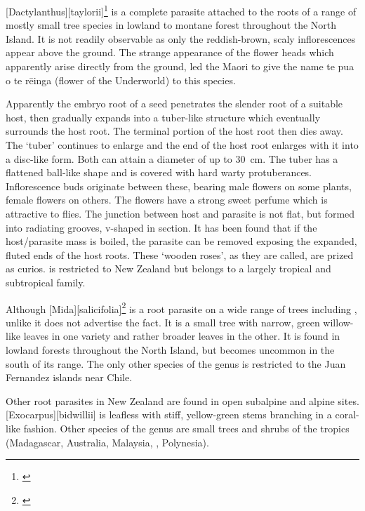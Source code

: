 [Dactylanthus][taylorii]\footnote{\cite{moore1940structure}} is a complete parasite attached to the roots of a range of mostly small tree species in lowland to montane forest throughout the North Island.
It is not readily observable as only the reddish-brown, scaly inflorescences appear above the ground.
The strange appearance of the flower heads which apparently arise directly from the ground, led the Maori to give the name te pua o te rēinga (flower of the Underworld) to this species.

Apparently the embryo root of a  seed penetrates the slender root of a suitable host, then gradually expands into a tuber-like structure which eventually surrounds the host root.
The terminal portion of the host root then dies away.
The `tuber' continues to enlarge and the end of the host root enlarges with it into a disc-like form.
Both can attain a diameter of up to \SI{30}{\centi\metre}.
The tuber has a flattened ball-like shape and is covered with hard warty protuberances.
Inflorescence buds originate between these, bearing male flowers on some plants, female flowers on others.
The flowers have a strong sweet perfume which is attractive to flies.
The junction between host and parasite is not flat, but formed into radiating grooves, v-shaped in section.
It has been found that if the host/parasite mass is boiled, the parasite can be removed exposing the expanded, fluted ends of the host roots.
These `wooden roses', as they are called, are prized as curios.  is restricted to New Zealand but belongs to a largely tropical and subtropical family.

Although [Mida][salicifolia]\footnote{\cite{philipson1959some}} is a root parasite on a wide range of trees including , unlike  it does not advertise the fact.
It is a small tree with narrow, green willow-like leaves in one variety and rather broader leaves in the other.
It is found in lowland forests throughout the North Island, but becomes uncommon in the south of its range.
The only other species of the genus is restricted to the Juan Fernandez islands near Chile.

Other root parasites in New Zealand are found in open subalpine and alpine sites. [Exocarpus][bidwillii] is leafless with stiff, yellow-green stems branching in a coral-like fashion.
Other species of the genus are small trees and shrubs of the tropics (Madagascar, Australia, Malaysia, , Polynesia).

